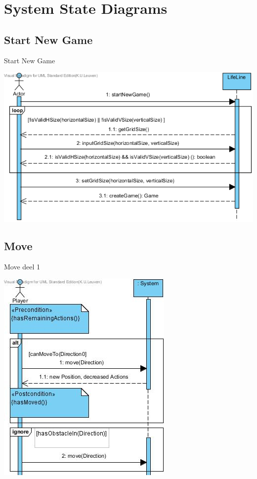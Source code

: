 \documentclass[t]{beamer}
\begin{document}
\section{System State Diagrams}
\subsection{Start New Game}
\begin{frame}{Start New Game}
\begin{center}
\includegraphics[width=0.90\linewidth]{images/SSDStartNewGame}
\end{center}
\end{frame}

\subsection{Move}
\begin{frame}{Move deel 1}
\begin{center}
\includegraphics[scale=0.6]{images/SSDMove1}
\end{center}
\end{frame}
\end{document}
